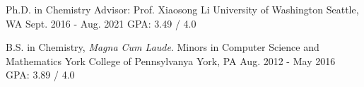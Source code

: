 

\begin{cventries}

  \cventry
    {Ph.D. in Chemistry\newline
    Advisor: Prof. Xiaosong Li}%
    {University of Washington} %
    {Seattle, WA} %
    {Sept. 2016 - Aug. 2021} %
    {GPA: 3.49 / 4.0} %



  \cventry
    {B.S. in Chemistry, \emph{Magna Cum Laude}. Minors in Computer Science and Mathematics} %
    {York College of Pennsylvanya} %
    {York, PA} %
    {Aug. 2012 - May 2016} %
    {GPA: 3.89 / 4.0} %

\end{cventries}
